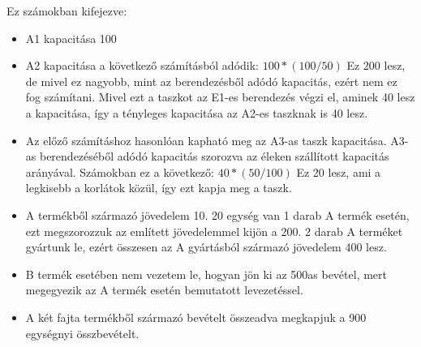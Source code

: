 Ez számokban kifejezve:
\begin{itemize}
	\item[] A1 kapacitása 100
	\item[] A2 kapacitása a következő számításból adódik: $100*(100/50)$ Ez 200 lesz, de mivel ez nagyobb, mint az berendezésből adódó kapacitás, ezért nem ez fog számítani. Mivel ezt a taszkot az E1-es berendezés végzi el, aminek 40 lesz a kapacitása, így a tényleges kapacitása az A2-es taszknak is 40 lesz.
	\item[] Az előző számításhoz hasonlóan kapható meg az A3-as taszk kapacitása. A3-as berendezéséből adódó kapacitás szorozva az éleken szállított  kapacitás arányával. Számokban ez a következő: $40*(50/100)$ Ez 20 lesz, ami a legkisebb a korlátok közül, így ezt kapja meg a taszk.
	\item[] A termékből származó jövedelem 10. 20 egység van 1 darab A termék esetén, ezt megszorozzuk az említett jövedelemmel kijön a 200. 2 darab A terméket gyártunk le, ezért összesen az A gyártásból származó jövedelem 400 lesz.
	\item[] B termék esetében nem vezetem le, hogyan jön ki az 500as bevétel, mert megegyezik az A termék esetén bemutatott levezetéssel.
	\item[] A két fajta termékből származó bevételt összeadva megkapjuk a 900 egységnyi összbevételt.
\end{itemize}

